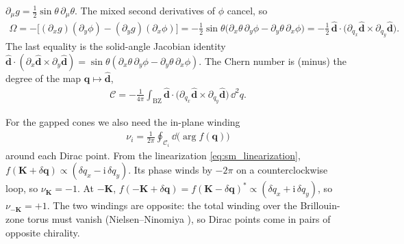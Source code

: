\documentclass[
  aps,
  prl,
  preprint,
  amsmath,
  amssymb,
  superscriptaddress,
  floatfix
]{revtex4-2}
\newcommand{\ii}{\mathrm{i}}
\newcommand{\pp}{\partial}
\newcommand{\C}{\mathcal{C}}
\begin{document}
$\pp_\mu g=\tfrac12\sin\theta\,\pp_\mu\theta$. The mixed second derivatives
of $\phi$ cancel, so
\begin{align}
  \Omega=-\big[(\pp_x g)(\pp_y\phi)-(\pp_y g)(\pp_x\phi)\big]
  =-\tfrac12\sin\theta\big(\pp_x\theta\,\pp_y\phi-\pp_y\theta\,\pp_x\phi\big)
  = -\tfrac12\,\hat{\bm d}\cdot\big(\pp_{q_x}\hat{\bm d}\times\pp_{q_y}\hat{\bm d}\big).
  \label{eq:sm_berry_curvature}
\end{align}
The last equality is the solid-angle Jacobian identity $\hat{\bm
d}\cdot(\pp_x\hat{\bm d}\times\pp_y\hat{\bm
d})=\sin\theta(\pp_x\theta\,\pp_y\phi-\pp_y\theta\,\pp_x\phi)$. The Chern
number is (minus) the degree of the map $\bm q\mapsto\hat{\bm d}$,
\begin{align}
  \C=-\frac{1}{4\pi}\int_{\text{BZ}}\hat{\bm d}\cdot\big(\pp_{q_x}\hat{\bm d}\times\pp_{q_y}\hat{\bm d}\big)\,\dd^2q .
  \label{eq:sm_chern_winding}
\end{align}

For the gapped cones we also need the in-plane winding
\begin{align}
  \nu_i=\frac{1}{2\pi}\oint_{\mathcal C_i}\dd\big(\arg f(\bm q)\big)
\end{align}
around each Dirac point. From the linearization \cref{eq:sm_linearization},
$f(\bm K+\delta\bm q)\propto(\delta q_x-\ii\,\delta q_y)$. Its phase
winds by $-2\pi$ on a counterclockwise loop, so $\nu_{\bm K}=-1$. At $-\bm K$,
$f(-\bm K+\delta\bm q)=f(\bm K-\delta\bm q)^*\propto(\delta q_x+\ii\,\delta
q_y)$, so $\nu_{-\bm K}=+1$. The two windings are opposite:
the total winding over the Brillouin-zone torus must vanish
(Nielsen--Ninomiya \cite{NielsenNinomiya1981}), so Dirac points come in
pairs of opposite chirality.
\end{document}
